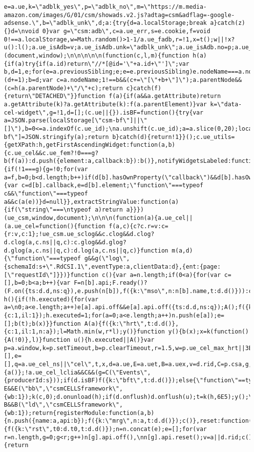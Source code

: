 \documentclass[
]{article}
\begin{document}
\begin{verbatim}
e=a.ue,k=\"adblk_yes\",p=\"adblk_no\",m=\"https://m.media-amazon.com/images/G/01/csm/showads.v2.js?adtag=csm&adflag=-google-adsense.\",b=\"adblk_unk\",d;a:{try{d=a.localStorage;break a}catch(z){}d=\nvoid 0}var g=\"csm:adb\",c=a.ue_err,s=e.cookie,f=void 0!==a.localStorage,w=Math.random()>1-1/a.ue_fadb,r=!1,x=t();w||!x?u():l();a.ue_isAdb=v;a.ue_isAdb.unk=\"adblk_unk\";a.ue_isAdb.no=p;a.ue_isAdb.yes=k}},\"adb\")(document,window);\n\n\n\n\n(function(c,l,m){function h(a){if(a)try{if(a.id)return\"//*[@id='\"+a.id+\"']\";var b,d=1,e;for(e=a.previousSibling;e;e=e.previousSibling)e.nodeName===a.nodeName&&(d+=1);b=d;var c=a.nodeName;1!==b&&(c+=\"[\"+b+\"]\");a.parentNode&&(c=h(a.parentNode)+\"/\"+c);return c}catch(f){return\"DETACHED\"}}function f(a){if(a&&a.getAttribute)return a.getAttribute(k)?a.getAttribute(k):f(a.parentElement)}var k=\"data-cel-widget\",g=!1,d=[];(c.ue||{}).isBF=function(){try{var a=JSON.parse(localStorage[\"csm-bf\"]||\"[]\"),b=0<=a.indexOf(c.ue_id);\na.unshift(c.ue_id);a=a.slice(0,20);localStorage[\"csm-bf\"]=JSON.stringify(a);return b}catch(d){return!1}}();c.ue_utils={getXPath:h,getFirstAscendingWidget:function(a,b){c.ue_cel&&c.ue_fem?!0===g?b(f(a)):d.push({element:a,callback:b}):b()},notifyWidgetsLabeled:function(){if(!1===g){g=!0;for(var a=f,b=0;b<d.length;b++)if(d[b].hasOwnProperty(\"callback\")&&d[b].hasOwnProperty(\"element\")){var c=d[b].callback,e=d[b].element;\"function\"===typeof c&&\"function\"===typeof a&&c(a(e))}d=null}},extractStringValue:function(a){if(\"string\"===\ntypeof a)return a}}})(ue_csm,window,document);\n\n\n(function(a){a.ue_cel||(a.ue_cel=function(){function f(a,c){c?c.r=v:c={r:v,c:1};!ue_csm.ue_sclog&&c.clog&&d.clog?d.clog(a,c.ns||q,c):c.glog&&d.glog?d.glog(a,c.ns||q,c):d.log(a,c.ns||q,c)}function m(a,d){\"function\"===typeof g&&g(\"log\",{schemaId:s+\".RdCSI.1\",eventType:a,clientData:d},{ent:{page:[\"requestId\"]}})}function c(){var a=n.length;if(0<a){for(var c=[],b=0;b<a;b++){var F=n[b].api;F.ready()?(F.on({ts:d.d,ns:q}),e.push(n[b]),f({k:\"mso\",n:n[b].name,t:d.d()})):c.push(n[b])}n=c}}function h(){if(!h.executed){for(var a=\n0;a<e.length;a++)e[a].api.off&&e[a].api.off({ts:d.d,ns:q});A();f({k:\"eod\",t0:d.t0,t:d.d()},{c:1,il:1});h.executed=1;for(a=0;a<e.length;a++)n.push(e[a]);e=[];b(t);b(x)}}function A(a){f({k:\"hrt\",t:d.d()},{c:1,il:1,n:a});l=Math.min(w,r*l);y()}function y(){b(x);x=k(function(){A(!0)},l)}function u(){h.executed||A()}var p=a.window,k=p.setTimeout,b=p.clearTimeout,r=1.5,w=p.ue_cel_max_hrt||3E4,s=\"robotdetection\",n=[],e=[],q=a.ue_cel_ns||\"cel\",t,x,d=a.ue,E=a.uet,B=a.uex,v=d.rid,C=p.csa,g,l=p.ue_cel_hrt_int||\n3E3,z=p.requestAnimationFrame||function(a){a()};!a.ue_cel_lclia&&C&&(g=C(\"Events\",{producerId:s}));if(d.isBF)f({k:\"bft\",t:d.d()});else{\"function\"==typeof E&&E(\"bb\",\"csmCELLSframework\",{wb:1});k(c,0);d.onunload(h);if(d.onflush)d.onflush(u);t=k(h,6E5);y();\"function\"==typeof B&&B(\"ld\",\"csmCELLSframework\",{wb:1});return{registerModule:function(a,b){n.push({name:a,api:b});f({k:\"mrg\",n:a,t:d.d()});c()},reset:function(a){f({k:\"rst\",t0:d.t0,t:d.d()});n=n.concat(e);e=[];for(var r=n.length,g=0;g<r;g++)n[g].api.off(),\nn[g].api.reset();v=a||d.rid;c();b(t);t=k(h,6E5);h.executed=0},timeout:function(a,d){return 
\end{verbatim}
\end{document}
